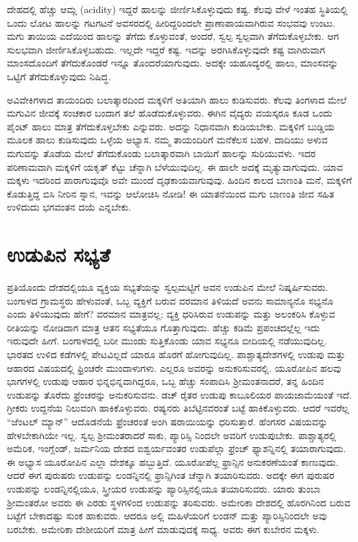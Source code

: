 ದೇಹದಲ್ಲಿ ಹೆಚ್ಚು ಆಮ್ಲ (acidity) ಇದ್ದರೆ ಹಾಲನ್ನು ಜೀರ್ಣಿಸಿಕೊಳ್ಳುವುದು ಕಷ್ಟ. ಕೆಲವು ವೇಳೆ ಇಂತಹ ಸ್ಥಿತಿಯಲ್ಲಿ ಒಂದು ಲೋಟ ಹಾಲನ್ನು ಗಟಗಟನೆ ಅವಸರದಲ್ಲಿ ಹೀರಿದ್ದರಿಂದಲೇ ಪ್ರಾಣಾಪಾಯವಾಗಿರುವ ಸಂಭವವು ಉಂಟು. ಮಗು ತಾಯಿಯ ಎದೆಯಿಂದ ಹಾಲನ್ನು ತೆಗೆದು ಕೊಳ್ಳುವಂತೆ, ಅಂದರೆ, ಸ್ವಲ್ಪ ಸ್ವಲ್ಪವಾಗಿ ತೆಗೆದುಕೊಳ್ಳಬೇಕು. ಆಗ ಸುಲಭವಾಗಿ ಜೀರ್ಣಿಸಿಕೊಳ್ಳಬಹುದು. ಇಲ್ಲದೇ ಇದ್ದರೆ ಕಷ್ಟ. ಇದನ್ನು ಅರಗಿಸಿಕೊಳ್ಳು\break ವುದೇ ಕಷ್ಟ ವಾಗಿರುವಾಗ ಮಾಂಸದೊಂದಿಗೆ ತೆಗೆದುಕೊಂಡರೆ ಇನ್ನೂ ತೊಂದರೆಯಾಗು\break ವುದು. ಅದಕ್ಕೇ ಯಹೂದ್ಯರಲ್ಲಿ ಹಾಲು, ಮಾಂಸವನ್ನು ಒಟ್ಟಿಗೆ ತೆಗೆದುಕೊಳ್ಳುವುದು ನಿಷಿದ್ಧ.

ಅವಿವೇಕಿಗಳಾದ ತಾಯಂದಿರು ಬಲಾತ್ಕಾರದಿಂದ ಮಕ್ಕಳಿಗೆ ಅತಿಯಾಗಿ ಹಾಲು ಕುಡಿಸುವರು. ಕೆಲವು ತಿಂಗಳಾದ ಮೇಲೆ ಮಗುವಿನ ಜೀವಕ್ಕೆ ಸಂಚಕಾರ ಬಂದಾಗ ತಲೆ ಹೊಡೆದುಕೊಳ್ಳುವರು. ಈಗಿನ ವೈದ್ಯರು ವಯಸ್ಕರೂ ಕೂಡ ಒಂದು ಪೈಂಟ್​ ಹಾಲು ಮಾತ್ರ ತೆಗೆದುಕೊಳ್ಳಬೇಕು ಎನ್ನುವರು. ಅದನ್ನು ನಿಧಾನವಾಗಿ ಕುಡಿಯಬೇಕು. ಮಕ್ಕಳಿಗೆ ಬುಡ್ಡಿಯ ಮೂಲಕ ಹಾಲು ಕುಡಿಸುವುದು ಒಳ್ಳೆಯ ಅಭ್ಯಾಸ. ನಮ್ಮ ತಾಯಂದಿರಿಗೆ ಮನೆಕೆಲಸ ಬಹಳ. ದಾದಿಯು ಅಳುವ ಮಗುವನ್ನು ತೊಡೆಯ ಮೇಲೆ ತೆಗೆದುಕೊಂಡು ಬಲಾತ್ಕಾರವಾಗಿ ಬಾಯಿಗೆ ಹಾಲನ್ನು ಸುರಿಯುವಳು. ಇದರ ಪರಿಣಾಮವಾಗಿ ಮಕ್ಕಳಿಗೆ ಯಕೃತ್​ ಕೆಟ್ಟು ಚೆನ್ನಾಗಿ ಬೆಳೆಯುವುದಿಲ್ಲ. ಈ ಹಾಲೇ ಅದಕ್ಕೆ ಮೃತ್ಯುವಾಗುವುದು. ಯಾವ ಮಕ್ಕಳು ಇದರಿಂದ ಪಾರಾಗುವುವೊ ಅವೇ ಮುಂದೆ ದೃಢಕಾಯವಾಗುವುವು. ಹಿಂದಿನ ಕಾಲದ ಬಾಣಂತಿ ಮನೆ, ಮಕ್ಕಳಿಗೆ ಕೊಡುತ್ತಿದ್ದ ಬಿಸಿ ನೀರಿನ ಸ್ನಾನ, ಇವನ್ನು ಆಲೋಚಿಸಿ ನೋಡಿ! ಈ ಯಾತನೆಯಿಂದ ಮಗು ಬಾಣಂತಿ ಜೀವ ಸಹಿತ ಉಳಿದುದು ಭಗವಂತನ ದಯೆ ಎನ್ನಬೇಕು.

\newpage

\section*{ಉಡುಪಿನ ಸಭ್ಯತೆ}

ಪ್ರತಿಯೊಂದು ದೇಶದಲ್ಲಿಯೂ ವ್ಯಕ್ತಿಯ ಸಭ್ಯತೆಯನ್ನು ಸ್ವಲ್ಪಮಟ್ಟಿಗೆ ಅವನ ಉಡುಪಿನ ಮೇಲೆ ನಿಷ್ಕರ್ಷಿಸುವರು. ಬಂಗಾಳದ ಗ್ರಾಮಸ್ಥರು ಹೇಳುವಂತೆ, ಒಬ್ಬ ವ್ಯಕ್ತಿಗೆ ಬರುವ ವರಮಾನ ತಿಳಿಯದೆ ಅವನು ಸಾಮಾನ್ಯನೊ ಸಭ್ಯನೊ ಎಂದು ತಿಳಿಯುವುದು ಹೇಗೆ? ವರಮಾನ ಮಾತ್ರವಲ್ಲ; ವ್ಯಕ್ತಿ ಧರಿಸಿರುವ ಉಡುಪನ್ನು ಮತ್ತು ಅಲಂಕರಿಸಿ ಕೊಳ್ಳುವ ರೀತಿಯನ್ನು ನೋಡಿದಾಗ ಮಾತ್ರ ಆತನ ಸಭ್ಯತೆಯೂ ಗೊತ್ತಾಗುವುದು. ಹೆಚ್ಚು ಕಡಿಮೆ ಪ್ರಪಂಚದಲ್ಲೆಲ್ಲ ಇದು ಇರುವುದೇ ಹೀಗೆ. ಬಂಗಾಳದಲ್ಲಿ ಬರೀ ಮುಂಡು ಸುತ್ತಿಕೊಂಡು ಯಾವ ಸಭ್ಯನೂ ಬೀದಿಯಲ್ಲಿ ನಡೆಯುವುದಿಲ್ಲ. ಭಾರತದ ಉಳಿದ ಕಡೆಗಳಲ್ಲಿ ಪೇಟವಿಲ್ಲದೆ ಯಾರೂ ಹೊರಗೆ ಹೋಗುವುದಿಲ್ಲ. ಪಾಶ್ಚಾತ್ಯದೇಶಗಳಲ್ಲಿ ಉಡುಪು ಮತ್ತು ಆಹಾರದ ವಿಷಯದಲ್ಲಿ ಫ್ರಿಂಚರೇ ಮುಂದಾಳುಗಳು. ಎಲ್ಲರೂ ಅವರನ್ನು ಅನುಕರಿಸುವರಲ್ಲಿ. ಯೂರೋಪಿನ ಹಲವು ಭಾಗಗಳಲ್ಲಿ ಉಡುಪು ಆಹಾರ ಭಿನ್ನಭಿನ್ನವಾಗಿದ್ದರೂ, ಒಬ್ಬ ಹೆಚ್ಚು ಸಂಪಾದಿಸಿ ಶ‍್ರೀಮಂತನಾದರೆ, ತನ್ನ ಹಿಂದಿನ ಉಡುಪನ್ನು ತೊರೆದು ಫ್ರೆಂಚರನ್ನು ಅನುಕರಿಸುವನು. ಡಚ್​ ರೈತರ ಉಡುಪು ಕಾಬೂಲಿಯರ ಪಾಯಜಾಮೆಯಂತೆ ಇದೆ. ಗ್ರೀಕರು ಉದ್ದನೆಯ ನಿಲುವಂಗಿ ಹಾಕಿಕೊಳ್ಳುವರು. ರಷ್ಯನರು ತಿಬೆಟ್ಟಿನವರಂತೆ ಬಟ್ಟೆ ಹಾಕಿಕೊಳ್ಳುವರು. ಆದರೆ ಇವರೆಲ್ಲ “ಜೆಂಟಲ್​ ಮ್ಯಾನ್​” ಆದೊಡನೆಯೆ ಫ್ರೆಂಚರಂತೆ ಅಂಗಿ ಷರಾಯಿಯನ್ನು ಧರಿಸುತ್ತಾರೆ. ಹೆಂಗಸರ ವಿಷಯವನ್ನು ಹೇಳಬೇಕಾಗಿಯೇ ಇಲ್ಲ. ಸ್ವಲ್ಪ ಶ‍್ರೀಮಂತರಾದರೆ ಸಾಕು, ಪ್ಯಾರಿಸ್ಸಿ ನಿಂದಲೇ ಅವರಿಗೆ ಉಡುಪುಬೇಕು. ಪಾಶ್ಚಾತ್ಯರಲ್ಲಿ ಅಮೆರಿಕ, ಇಂಗ್ಲೆಂಡ್​, ಜರ್ಮನಿಯ ದೇಶದ ಐಶ್ವರ್ಯವಂತರ ಉಡುಪೆಲ್ಲಾ ಫ್ರೆಂಚ್​ ಫ್ಯಾಶನ್ನಿನಲ್ಲಿ ತಯಾರಾಗುವುದು. ಈ ಅಭ್ಯಾಸ ಯೂರೋಪಿನ ಎಲ್ಲಾ ದೇಶಕ್ಕೂ ಹಬ್ಬುತ್ತಿದೆ. ಯೂರೋಪೆಲ್ಲ ಫ್ರಾನ್ಸಿನ ಅನುಕರಣೆಯಂತೆ ಕಾಣುವುದು. ಆದರೆ ಈಗ ಪುರುಷರು ಉಡುಪನ್ನು ಲಂಡನ್ನಿನಲ್ಲಿ ಫ್ರಾನ್ಸಿಗಿಂತ ಚೆನ್ನಾಗಿ ತಯಾರಿಸುವರು. ಅದಕ್ಕೇ ಈಗ ಪುರುಷರ ಉಡುಪನ್ನು ಲಂಡನ್ನಿನಲ್ಲಿಯೂ, ಸ್ತ್ರೀಯರ ಉಡುಪನ್ನು ಪ್ಯಾರಿಸ್ಸಿನಲ್ಲಿಯೂ ತಯಾರಿಸುವರು. ಯಾರು ತುಂಬಾ ಶ‍್ರೀಮಂತರೋ ಅವರು ಈ ಎರಡು ಸ್ಥಳಗಳಿಂದ ಉಡುಪನ್ನು ತರಿಸುವರು. ಅಮೇರಿಕಾ ದೇಶದಲ್ಲಿ ಹೊರಗಿನಿಂದ ಬರುವ ಬಟ್ಟೆಗೆ ಬೇಕಾದಷ್ಟು ಸುಂಕ ಹಾಕುವರು. ಆದರೂ ಅಲ್ಲಿ ಮಹಿಳೆಯರಿಗೆ ಲಂಡನ್​ ಮತ್ತು ಪ್ಯಾರಿಸ್ಸಿನಿಂದಲೇ ಅವು ಬರಬೇಕು. ಅಮೇರಿಕಾ ದೇಶೀಯರಿಗೆ ಮಾತ್ರ ಹೀಗೆ ಮಾಡುವುದಕ್ಕೆ ಸಾಧ್ಯ. ಅವರು ಈಗ ಕುಬೇರನ ಮಕ್ಕಳು.

